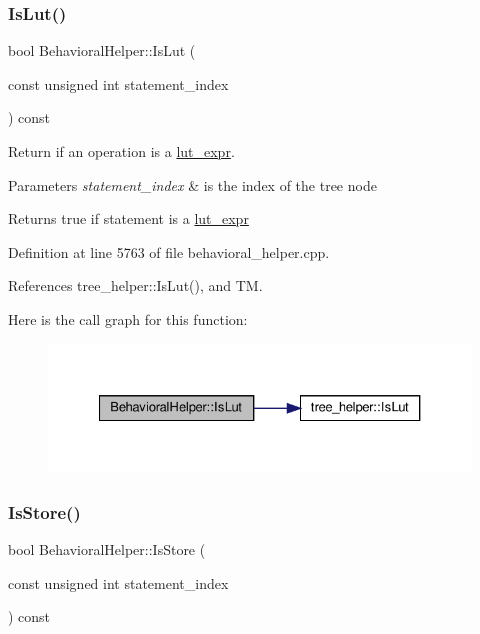 \subsubsection{\texorpdfstring{Is\+Lut()}{IsLut()}}
{\footnotesize\ttfamily bool Behavioral\+Helper\+::\+Is\+Lut (\begin{DoxyParamCaption}\item[{const unsigned int}]{statement\+\_\+index }\end{DoxyParamCaption}) const}



Return if an operation is a \hyperlink{structlut__expr}{lut\+\_\+expr}. 


\begin{DoxyParams}{Parameters}
{\em statement\+\_\+index} & is the index of the tree node \\
\hline
\end{DoxyParams}
\begin{DoxyReturn}{Returns}
true if statement is a \hyperlink{structlut__expr}{lut\+\_\+expr} 
\end{DoxyReturn}


Definition at line 5763 of file behavioral\+\_\+helper.\+cpp.



References tree\+\_\+helper\+::\+Is\+Lut(), and TM.

Here is the call graph for this function\+:
\nopagebreak
\begin{figure}[H]
\begin{center}
\leavevmode
\includegraphics[width=327pt]{dd/db2/classBehavioralHelper_ab73c076216b524091752657d4c399fda_cgraph}
\end{center}
\end{figure}
\mbox{\label{classBehavioralHelper_ad7192a9a6392ac06d5d2cc429267445a}} 
\subsubsection{\texorpdfstring{Is\+Store()}{IsStore()}}
{\footnotesize\ttfamily bool Behavioral\+Helper\+::\+Is\+Store (\begin{DoxyParamCaption}\item[{const unsigned int}]{statement\+\_\+index }\end{DoxyParamCaption}) const}



